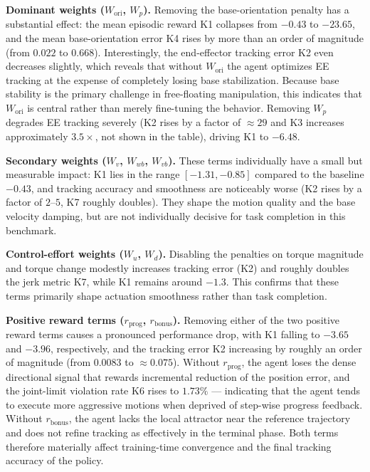 \documentclass{ieeeaccess}
\newenvironment{rtwohl}
  {\def\FrameCommand{\colorbox{rtwo}}\MakeFramed{\advance\hsize-\width\FrameRestore}}
  {\endMakeFramed}
\begin{document}
\begin{rtwohl}
\noindent\textbf{Dominant weights ($W_{\mathrm{ori}}$, $W_p$).} Removing the base-orientation penalty has a substantial effect: the mean
episodic reward K1 collapses from $-0.43$ to $-23.65$, and the mean base-orientation error K4 rises by more than an order of
magnitude (from $0.022$ to $0.668$). Interestingly, the end-effector tracking error K2 even decreases slightly, which reveals that
without $W_{\mathrm{ori}}$ the agent optimizes EE tracking at the expense of completely losing base stabilization. Because base
stability is the primary challenge in free-floating manipulation, this indicates that $W_{\mathrm{ori}}$ is central
rather than merely fine-tuning the behavior. Removing $W_p$ degrades EE tracking severely (K2 rises by a factor of $\approx 29$
and K3 increases approximately $3.5\times$, not shown in the table), driving K1 to $-6.48$.

\noindent\textbf{Secondary weights ($W_v$, $W_{wb}$, $W_{vb}$).} These terms individually have a small but measurable impact:
K1 lies in the range $[-1.31, -0.85]$ compared to the baseline $-0.43$, and tracking accuracy and smoothness are noticeably worse
(K2 rises by a factor of $2$–$5$, K7 roughly doubles). They shape the motion quality and the base velocity damping, but are not
individually decisive for task completion in this benchmark.

\noindent\textbf{Control-effort weights ($W_u$, $W_d$).} Disabling the penalties on torque magnitude and torque change modestly
increases tracking error (K2) and roughly doubles the jerk metric K7, while K1 remains around $-1.3$. This confirms that these
terms primarily shape actuation smoothness rather than task completion.

\noindent\textbf{Positive reward terms ($r_{\text{prog}}$, $r_{\text{bonus}}$).} Removing either of the two positive reward terms
causes a pronounced performance drop, with K1 falling to $-3.65$ and $-3.96$, respectively, and the tracking error K2 increasing
by roughly an order of magnitude (from $0.0083$ to $\approx 0.075$). Without $r_{\text{prog}}$, the agent loses the dense
directional signal that rewards incremental reduction of the position error, and the joint-limit violation rate K6 rises to
$1.73\%$ — indicating that the agent tends to execute more aggressive motions when deprived of step-wise progress feedback.
Without $r_{\text{bonus}}$, the agent lacks the local attractor near the reference trajectory and does not refine tracking
as effectively in the terminal phase. Both terms therefore materially affect training-time convergence
and the final tracking accuracy of the policy.


\end{rtwohl}
\end{document}
